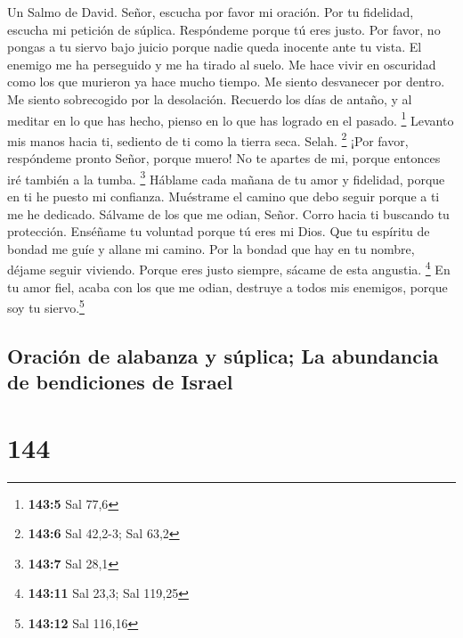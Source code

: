 Un Salmo de David.  Señor, escucha por favor mi oración.
Por tu fidelidad, escucha mi petición de súplica. Respóndeme porque tú
eres justo.  Por favor, no pongas a tu siervo bajo juicio
porque nadie queda inocente ante tu vista.  El enemigo me
ha perseguido y me ha tirado al suelo. Me hace vivir en oscuridad como
los que murieron ya hace mucho tiempo.  Me siento
desvanecer por dentro. Me siento sobrecogido por la desolación.
 Recuerdo los días de antaño, y al meditar en lo que has
hecho, pienso en lo que has logrado en el pasado. \footnote{\textbf{143:5}
  Sal 77,6}  Levanto mis manos hacia ti, sediento de ti
como la tierra seca. Selah. \footnote{\textbf{143:6} Sal 42,2-3; Sal
  63,2}  ¡Por favor, respóndeme pronto Señor, porque
muero! No te apartes de mi, porque entonces iré también a la tumba.
\footnote{\textbf{143:7} Sal 28,1}  Háblame cada mañana de
tu amor y fidelidad, porque en ti he puesto mi confianza. Muéstrame el
camino que debo seguir porque a ti me he dedicado. 
Sálvame de los que me odian, Señor. Corro hacia ti buscando tu
protección.  Enséñame tu voluntad porque tú eres mi Dios.
Que tu espíritu de bondad me guíe y allane mi camino. 
Por la bondad que hay en tu nombre, déjame seguir viviendo. Porque eres
justo siempre, sácame de esta angustia. \footnote{\textbf{143:11} Sal
  23,3; Sal 119,25}  En tu amor fiel, acaba con los que
me odian, destruye a todos mis enemigos, porque soy tu
siervo.\footnote{\textbf{143:12} Sal 116,16}

\hypertarget{oraciuxf3n-de-alabanza-y-suxfaplica-la-abundancia-de-bendiciones-de-israel}{%
\subsection{Oración de alabanza y súplica; La abundancia de bendiciones
de
Israel}\label{oraciuxf3n-de-alabanza-y-suxfaplica-la-abundancia-de-bendiciones-de-israel}}

\hypertarget{section-143}{%
\section{144}\label{section-143}}

